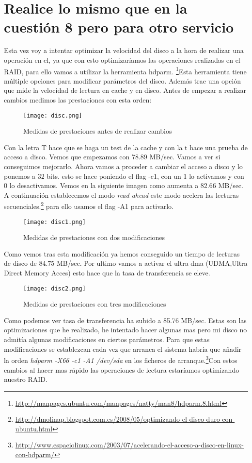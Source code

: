\section{Realice lo mismo que en la cuestión 8 pero para otro servicio}
Esta vez voy a intentar optimizar la velocidad del disco a la hora de realizar una operación en el, ya que con esto optimizaríamos las operaciones realizadas en el RAID, para ello vamos a utilizar la herramienta hdparm. \footnote{\url{http://manpages.ubuntu.com/manpages/natty/man8/hdparm.8.html}
}Esta herramienta tiene múltiple opciones para modificar parámetros del disco. Además trae una opción que mide la velocidad de lectura en cache y en disco.
Antes de empezar a realizar cambios medimos las prestaciones con esta orden:
\begin{figure}[H] 
\centering
\texttt{[image: disc.png]}  
\label{figura16:}
\caption{Medidas de prestaciones antes de realizar cambios}
\end{figure}
Con la letra T hace que se haga un test de la cache y con la t hace una prueba de acceso a disco. Vemos que empezamos con 78.89 MB/sec. Vamos a ver si conseguimos mejorarlo.
Ahora vamos a proceder a cambiar el acceso a disco y lo ponemos a 32 bits. esto se hace poniendo el flag -c1, con un 1 lo activamos y con 0 lo desactivamos. Vemos en la siguiente imagen como aumenta a 82.66 MB/sec. A continuación establecemos el modo \textit{read ahead} este modo acelera las lecturas secuenciales.\footnote{\url{http://dmolinap.blogspot.com.es/2008/05/optimizando-el-disco-duro-con-ubuntu.html}} para ello usamos el flag -A1 para activarlo.
\begin{figure}[H] 
\centering
\texttt{[image: disc1.png]}  
\label{figura17:}
\caption{Medidas de prestaciones con dos modificaciones}
\end{figure}
Como vemos tras esta modificación ya hemos conseguido un tiempo de lecturas de disco de 84.75 MB/sec.
Por ultimo vamos a activar el ultra dma (UDMA,Ultra Direct Memory Acces) esto hace que la tasa de transferencia se eleve.
\begin{figure}[H] 
\centering
\texttt{[image: disc2.png]}  
\label{figura18:}
\caption{Medidas de prestaciones con tres modificaciones}
\end{figure}
Como podemos ver tasa de transferencia ha subido a 85.76 MB/sec. Estas son las optimizaciones que he realizado, he intentado hacer algunas mas pero mi disco no admitía algunas modificaciones en ciertos parámetros.
Para que estas modificaciones se establezcan cada vez que arranca el sistema habría que añadir la orden \textit{hdparm -X66 -c1 -A1 /dev/sda} en los ficheros de arranque.\footnote{\url{http://www.espaciolinux.com/2003/07/acelerando-el-acceso-a-disco-en-linux-con-hdparm/}}Con estos cambios al hacer mas rápido las operaciones de lectura estaríamos optimizando nuestro RAID.
